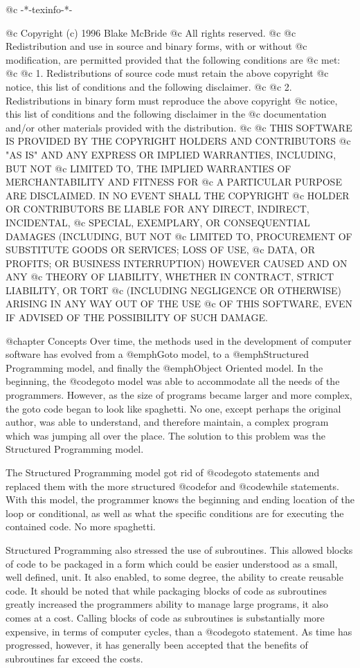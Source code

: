 @c -*-texinfo-*-

@c  Copyright (c) 1996 Blake McBride
@c  All rights reserved.
@c
@c  Redistribution and use in source and binary forms, with or without
@c  modification, are permitted provided that the following conditions are
@c  met:
@c
@c  1. Redistributions of source code must retain the above copyright
@c  notice, this list of conditions and the following disclaimer.
@c
@c  2. Redistributions in binary form must reproduce the above copyright
@c  notice, this list of conditions and the following disclaimer in the
@c  documentation and/or other materials provided with the distribution.
@c
@c  THIS SOFTWARE IS PROVIDED BY THE COPYRIGHT HOLDERS AND CONTRIBUTORS
@c  "AS IS" AND ANY EXPRESS OR IMPLIED WARRANTIES, INCLUDING, BUT NOT
@c  LIMITED TO, THE IMPLIED WARRANTIES OF MERCHANTABILITY AND FITNESS FOR
@c  A PARTICULAR PURPOSE ARE DISCLAIMED. IN NO EVENT SHALL THE COPYRIGHT
@c  HOLDER OR CONTRIBUTORS BE LIABLE FOR ANY DIRECT, INDIRECT, INCIDENTAL,
@c  SPECIAL, EXEMPLARY, OR CONSEQUENTIAL DAMAGES (INCLUDING, BUT NOT
@c  LIMITED TO, PROCUREMENT OF SUBSTITUTE GOODS OR SERVICES; LOSS OF USE,
@c  DATA, OR PROFITS; OR BUSINESS INTERRUPTION) HOWEVER CAUSED AND ON ANY
@c  THEORY OF LIABILITY, WHETHER IN CONTRACT, STRICT LIABILITY, OR TORT
@c  (INCLUDING NEGLIGENCE OR OTHERWISE) ARISING IN ANY WAY OUT OF THE USE
@c  OF THIS SOFTWARE, EVEN IF ADVISED OF THE POSSIBILITY OF SUCH DAMAGE.

@chapter Concepts
Over time, the methods used in the development of computer software has
evolved from a @emph{Goto} model, to a @emph{Structured Programming}
model, and finally the @emph{Object Oriented model}.  In the
beginning, the @code{goto} model was able to accommodate all the needs of the
programmers.  However, as the size of programs became larger and
more complex, the goto code began to look like spaghetti.  No one, except
perhaps the original author, was able to understand, and therefore
maintain, a complex program which was jumping all over the place.  The
solution to this problem was the Structured Programming model.

The Structured Programming model got rid of @code{goto} statements and
replaced them with the more structured @code{for} and @code{while}
statements.  With this model, the programmer knows the beginning and
ending location of the loop or conditional, as well as what the specific
conditions are for executing the contained code.  No more spaghetti.

Structured Programming also stressed the use of subroutines.  This
allowed blocks of code to be packaged in a form which could be easier
understood as a small, well defined, unit.  It also enabled, to some
degree, the ability to create reusable code.  It should be noted that
while packaging blocks of code as subroutines greatly increased the
programmers ability to manage large programs, it also comes at a cost.
Calling blocks of code as subroutines is substantially more expensive,
in terms of computer cycles, than a @code{goto} statement.  As time has
progressed, however, it has generally been accepted that the benefits of
subroutines far exceed the costs.

